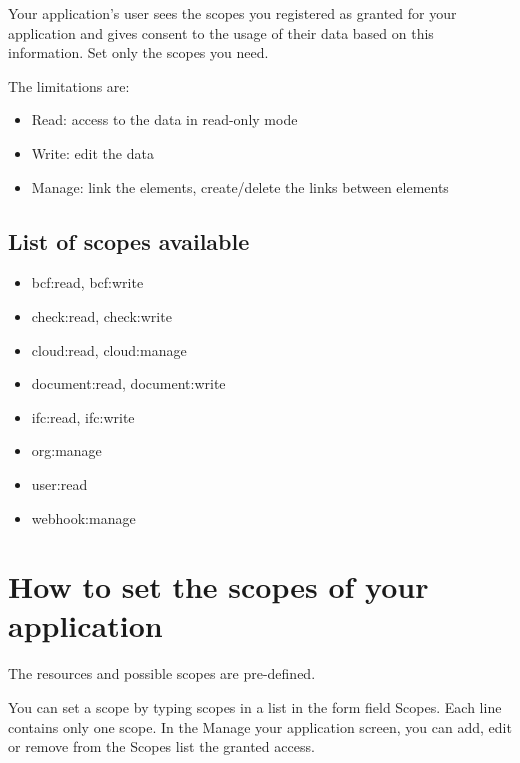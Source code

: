 \documentclass[a4paper,12pt,english]{sphinxmanual}
\begin{document}
Your application’s user sees the scopes you registered as granted for your application and gives consent to the usage of their data based on this information. Set only the scopes you need.

The limitations are:
\begin{itemize}
\item {} 
Read: access to the data in read-only mode

\item {} 
Write: edit the data

\item {} 
Manage: link the elements, create/delete the links between elements

\end{itemize}


\subsection{List of scopes available}
\label{\detokenize{scopes:list-of-scopes-available}}\begin{itemize}
\item {} 
bcf:read, bcf:write

\item {} 
check:read, check:write

\item {} 
cloud:read, cloud:manage

\item {} 
document:read, document:write

\item {} 
ifc:read, ifc:write

\item {} 
org:manage

\item {} 
user:read

\item {} 
webhook:manage

\end{itemize}


\section{How to set the scopes of your application}
\label{\detokenize{scopes:how-to-set-the-scopes-of-your-application}}
The resources and possible scopes are pre-defined.

You can set a scope by typing scopes in a list in the form field Scopes. Each line contains only one scope. In the Manage your application screen, you can add, edit or remove from the Scopes list the granted access.
\end{document}
